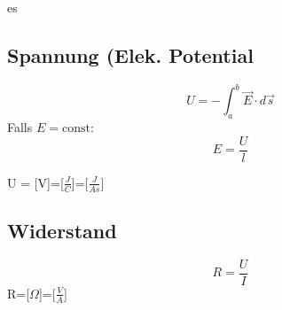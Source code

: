 es\documentclass[a4paper, fontsize=8pt, landscape]{scrartcl}
\begin{document}
\begin{multicols*}{4}
\subsection{Spannung (Elek. Potential}
    \[U = -\int_a^b \vec E \cdot d\vec s\]
    Falls $E = \text{const}$:
    \[ E = \frac{U}{l}\]

    U = [V]=[$\frac{J}{C}$]=[$\frac{J}{As}$]
    \subsection{Widerstand}
        \[ R = \frac{U}{I}\]
        R=[$\Omega$]=[$\frac{V}{A}$]


\end{multicols*}
\end{document}

